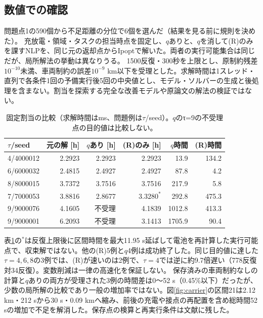 \documentclass[uplatex,dvipdfmx,a4paper,11pt,jafont=haranoaji]{bxjsarticle}
\newcommand{\answerpart}[1]{\par\Needspace{6\baselineskip}\subsection*{#1}}
\begin{document}
\answerpart{数値での確認}
問題点1の590個から不足距離の分位で6個を選んだ（結果を見る前に規則を決めた）。
充放電・領域・タスクの担当時点を固定し、$q$ありと、$q$を消して(R)のみを課すNLPを、同じ元の返却点からIpopt\cite{ipopt}で解いた。両者の実行可能集合は同じだが、局所解法の挙動は異なりうる。
1500反復・300秒を上限とし、原制約残差$10^{-10}$未満、車両制約の誤差$10^{-9}$ km以下を受理とした。求解時間は1スレッド・直列で各条件1回の予備実行後5回の中央値とし、モデル・ソルバーの生成と後処理を含まない。割当を探索する完全な改善モデルや原論文の解法の検証ではない。
\begin{table}[H]
  \centering
  \caption{固定割当の比較（求解時間はms、問題例は$\tau$/seed）。$q$のτ=9の不受理点の目的値は比較しない。}
  \label{tab:nlp}
  \begin{tabular}{lrrrrr}
    \toprule
    $\tau$/seed & 元の解 [h] & $q$あり [h] & (R)のみ [h] & $q$時間 & (R)時間 \\
    \midrule
    4/4000012 & 2.2923 & 2.2923 & 2.2923 & 13.9 & 134.2 \\
    6/6000032 & 2.4815 & 2.4927 & 2.4927 & 87.8 & 4.2 \\
    8/8000015 & 3.7372 & 3.7516 & 3.7516 & 217.9 & 5.8 \\
    7/7000053 & 3.8816 & 2.8677 & $3.3280^{*}$ & 292.8 & 475.3 \\
    9/9000076 & 4.1605 & 不受理 & 4.1839 & 1012.8 & 413.3 \\
    9/9000001 & 6.2093 & 不受理 & 3.1413 & 1705.9 & 90.4 \\
    \bottomrule
  \end{tabular}
\end{table}
表\ref{tab:nlp}の$^{*}$は反復上限後に区間時間を最大11.95 s延ばして電池を再計算した実行可能点で、収束解ではない。他の(R)5例と$q$4例は成功終了した。同じ目的値に達した$\tau=4,6,8$の3例では、(R)が速いのは2例で、$\tau=4$では逆に約9.7倍遅い（778反復対34反復）。変数削減は一律の高速化を保証しない。
保存済みの車両制約なしの計算と$q$ありの両方が受理された3例の時間差は0〜52 s（0.45\%以下）だったが、少数の局所解の比較であり一般の増加率ではない。図\ref{fig:carrier}の区間21は2.12 km・212 sから30 s・0.09 kmへ縮み、前後の充電や接点の再配置を含め総時間52 sの増加で不足を解消した。保存点の検算と再実行条件は文献\cite{repo}に残した。
\end{document}
